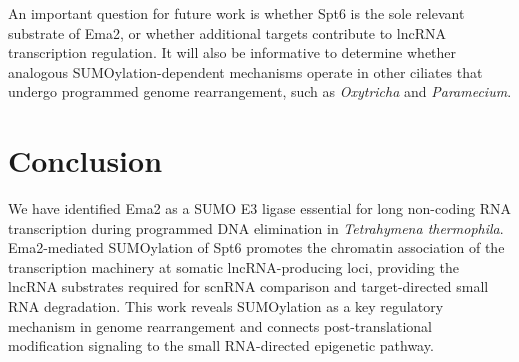 \documentclass[11pt]{article}
\begin{document}
An important question for future work is whether Spt6 is the sole relevant substrate of Ema2, or whether additional targets contribute to lncRNA transcription regulation. It will also be informative to determine whether analogous SUMOylation-dependent mechanisms operate in other ciliates that undergo programmed genome rearrangement, such as \textit{Oxytricha} and \textit{Paramecium}.

\section{Conclusion}

We have identified Ema2 as a SUMO E3 ligase essential for long non-coding RNA transcription during programmed DNA elimination in \textit{Tetrahymena thermophila}. Ema2-mediated SUMOylation of Spt6 promotes the chromatin association of the transcription machinery at somatic lncRNA-producing loci, providing the lncRNA substrates required for scnRNA comparison and target-directed small RNA degradation. This work reveals SUMOylation as a key regulatory mechanism in genome rearrangement and connects post-translational modification signaling to the small RNA-directed epigenetic pathway.



\end{document}
